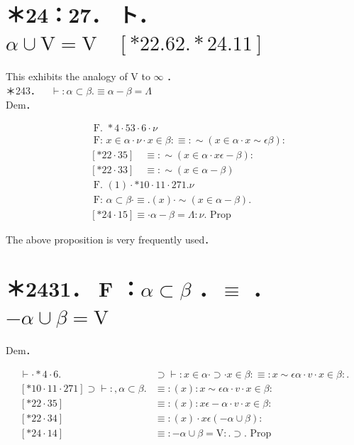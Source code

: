 \documentclass[10pt]{article}
\begin{document}
\section*{＊24：27． ト．$\alpha \cup \mathrm{V}=\mathrm{V} \quad[* 22.62 . * 24.11]$}
This exhibits the analogy of V to $\infty$ ．\\
＊243．$\quad \vdash: \alpha \subset \beta . \equiv \alpha-\beta=\Lambda$\\
Dem．


\begin{align*}
& \text { F. } * 4 \cdot 53 \cdot 6 \cdot \nu \\
& \text { F: } x \in \alpha \cdot \nu \cdot x \in \beta: \equiv: \sim(x \in \alpha \cdot x \sim \epsilon \beta): \\
& {[* 22 \cdot 35] \quad \equiv: \sim(x \in \alpha \cdot x \epsilon-\beta):} \\
& {[* 22 \cdot 33] \quad \equiv: \sim(x \in \alpha-\beta)}  \tag{1}\\
& \text { F. }(1) \cdot * 10 \cdot 11 \cdot 271 . \nu \\
& \text { F: } \alpha \subset \beta \cdot \equiv .(x) \cdot \sim(x \in \alpha-\beta) . \\
& {[* 24 \cdot 15] \equiv \cdot \alpha-\beta=\Lambda: \nu \text {. Prop }}
\end{align*}


The above proposition is very frequently used．

\section*{＊2431． F ：$\alpha \subset \beta$ ．$\equiv$ ．$-\alpha \cup \beta=\mathrm{V}$}
Dem．

$$
\begin{array}{ll}
\vdash \cdot * 4 \cdot 6 . & \supset \vdash: x \in \alpha \cdot \supset \cdot x \in \beta: \equiv: x \sim \epsilon \alpha \cdot v \cdot x \in \beta: . \\
{[* 10 \cdot 11 \cdot 271] \supset \vdash:, \alpha \subset \beta .} & \equiv:(x): x \sim \epsilon \alpha \cdot v \cdot x \in \beta: \\
{[* 22 \cdot 35]} & \equiv:(x): x \epsilon-\alpha \cdot v \cdot x \in \beta: \\
{[* 22 \cdot 34]} & \equiv:(x) \cdot x \epsilon(-\alpha \cup \beta): \\
{[* 24 \cdot 14]} & \equiv:-\alpha \cup \beta=\mathrm{V}: . \supset \text {. Prop }
\end{array}
$$
\end{document}
